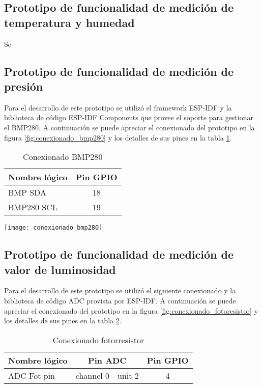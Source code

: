 \subsection{Prototipo de funcionalidad de medición de temperatura y humedad}

Se 



\subsection{Prototipo de funcionalidad de medición de presión}
Para el desarrollo de este prototipo se utilizó el framework ESP-IDF y la biblioteca de código ESP-IDF Components que provee el soporte para gestionar el BMP280. A continuación se puede apreciar el conexionado del prototipo en la figura \ref{fig:conexionado_bmp280} y los detalles de sus pines en la tabla \ref{tab:conexionado_bmp280}.

\vspace{0.5cm}    
\begin{table}[h]
\centering
\caption[Conexionado BMP280]{Conexionado BMP280}
\begin{tabular}{l c }
\toprule
\textbf{Nombre lógico} &  \textbf{Pin GPIO}\\
\midrule
 BMP SDA & 18 \\
 BMP280 SCL & 19  \\
\bottomrule
\hline
\end{tabular}
\label{tab:conexionado_bmp280} 
\end{table}
    
\vspace{0.5cm}    
\begin{center}
  \texttt{[image: conexionado\_bmp280]}
    \label{fig:conexionado_bmp280}
\end{center}




\subsection{Prototipo de funcionalidad de medición de valor de luminosidad}
Para el desarrollo de este prototipo se utilizó el siguiente conexionado y la biblioteca de código ADC provista por ESP-IDF. A continuación se puede apreciar el conexionado del prototipo en la figura \ref{fig:conexionado_fotoresistor} y los detalles de sus pines en la tabla \ref{tab:conexionado_fotoresistor}.

\vspace{0.5cm}    
\begin{table}[h]
\centering
\caption[Conexionado fotorresistor]{Conexionado fotorresistor}
\begin{tabular}{l c c}
\toprule
\textbf{Nombre lógico} & \textbf{Pin ADC} & \textbf{Pin GPIO}\\
\midrule
ADC Fot pin & channel 0 - unit 2 & 4\\
\bottomrule
\hline
\end{tabular}
\label{tab:conexionado_fotoresistor}
\end{table}


